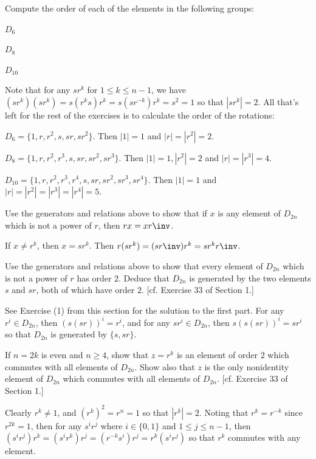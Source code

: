 \begin{problems}
    \item Compute the order of each of the elements in the following groups:
    \begin{problems}
        \item $D_6$
        \item $D_8$
        \item $D_{10}$
    \end{problems}
    \begin{sol}
        Note that for any $sr^k$ for $1 \leq k \leq n - 1$, we have $(sr^k)(sr^k) = s(r^ks)r^k = s(sr^{-k})r^k = s^2 = 1$ so that $|sr^k| = 2$. All that's left for the rest of the exercises is to calculate the order of the rotations:
        \begin{problems}
            \item $D_6 = \{1, r, r^2, s, sr, sr^2\}$. Then $|1| = 1$ and $|r| = |r^2| = 2$.
            \item $D_8 = \{1, r, r^2, r^3, s, sr, sr^2, sr^3\}$. Then $|1| = 1, |r^2| = 2$ and $|r| = |r^3| = 4$.
            \item $D_{10} = \{1, r, r^2, r^3, r^4, s, sr, sr^2, sr^3, sr^4\}$. Then $|1| = 1$ and $|r| = |r^2| = |r^3| = |r^4| = 5$. \qh
        \end{problems}
    \end{sol}
    \item Use the generators and relations above to show that if $x$ is any element of $D_{2n}$ which is not a power of $r$, then $rx = xr\inv$.
    \begin{sol}
        If $x \neq r^k$, then $x = sr^k$. Then $r(sr^k) = (sr\inv)r^k = sr^kr\inv$.
    \end{sol}
    \item Use the generators and relations above to show that every element of $D_{2n}$ which is not a power of $r$ has order $2$. Deduce that $D_{2n}$ is generated by the two elements $s$ and $sr$, both of which have order $2$. [cf. Exercise 33 of Section 1.] 
    \begin{sol}
        See Exercise (1) from this section for the solution to the first part. For any $r^i \in D_{2n}$, then $(s(sr))^i = r^i$, and for any $sr^i \in D_{2n}$, then $s(s(sr))^i = sr^i$ so that $D_{2n}$ is generated by $\{s, sr\}$.
    \end{sol}
    \item If $n = 2k$ is even and $n \ge 4$, show that $z = r^k$ is an element of order $2$ which commutes with all elements of $D_{2n}$. Show also that $z$ is the only nonidentity element of $D_{2n}$ which commutes with all elements of $D_{2n}$. [cf. Exercise 33 of Section 1.]   
    \begin{sol}
        Clearly $r^k \neq 1$, and $(r^k)^2 = r^n = 1$ so that $|r^k| = 2$. Noting that $r^k = r^{-k}$ since $r^{2k} = 1$, then for any $s^ir^j$ where $i \in \{0, 1\}$ and $1 \leq j \leq n - 1$, then $(s^ir^j)r^k = (s^ir^k)r^j = (r^{-k}s^i)r^j = r^k(s^ir^j)$ so that $r^k$ commutes with any element.
        

\end{sol}
\end{problems}
